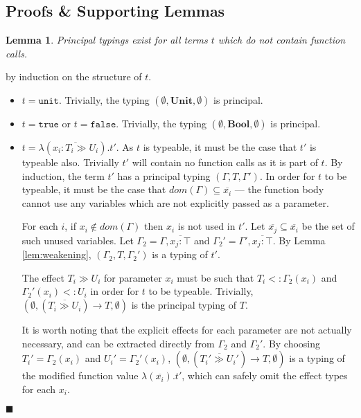 \documentclass[preprint]{sigplanconf}
\newtheorem{lem}{Lemma}
\newcommand{\lemref}[1]{Lemma \ref{#1}}
\newcommand{\unitv}{\mathtt{unit}}
\newcommand{\unitt}{\mathbf{Unit}}
\newcommand{\truev}{\mathtt{true}}
\newcommand{\falsev}{\mathtt{false}}
\newcommand{\boolt}{\mathbf{Bool}}
\newcommand{\funv}[4]{\lambda(\overline{#1 : #2 \gg #3}).#4}
\newcommand{\funt}[3]{(\overline{#1 \gg #2}) \rightarrow #3}
\newcommand{\qed}{$\blacksquare$}
\newenvironment{proof}{\vspace{1ex}\noindent{\bf Proof}\hspace{0.5em}}
  {\hfill\qed\vspace{1ex}}
\begin{document}

\subsection{Proofs \& Supporting Lemmas}

\begin{lem}
\label{lem:principal_nofun}
Principal typings exist for all terms $t$ which do not contain function calls.
\end{lem}

\begin{proof}
by induction on the structure of $t$.

\begin{itemize}
\item $t = \unitv$. 
Trivially, the typing $(\emptyset, \unitt, \emptyset)$ is principal.

\item $t = \truev$ or $t = \falsev$. 
Trivially, the typing $(\emptyset, \boolt, \emptyset)$ is principal.

\item $t = \funv{x_i}{T_i}{U_i}{t'}$. 
As $t$ is typeable, it must be the case that $t'$ is typeable also. Trivially
$t'$ will contain no function calls as it is part of $t$.
By induction, the term $t'$ has a principal typing
$(\Gamma, T, \Gamma')$. In order for $t$ to be typeable, it must be the case
that $dom(\Gamma) \subseteq \overline{x_i}$ --- the function body cannot use
any variables which are not explicitly passed as a parameter. 

For each $i$, if $x_i \notin dom(\Gamma)$
then $x_i$ is not used in $t'$. Let $\overline{x_j} \subseteq \overline{x_i}$
be the set of such unused variables.
Let $\Gamma_2 = \Gamma, \overline{x_j : \top}$ and 
$\Gamma_2' = \Gamma', \overline{x_j : \top}$.
By \lemref{lem:weakening}, $(\Gamma_2, T, \Gamma_2')$ is a typing of $t'$.

The effect $T_i \gg U_i$ for parameter $x_i$ must be such that 
$T_i <: \Gamma_2(x_i)$ and $\Gamma_2'(x_i) <: U_i$ in order for
$t$ to be typeable. 
Trivially, $(\emptyset, \funt{T_i}{U_i}{T}, \emptyset)$ is the principal
typing of $T$.

It is worth noting that the explicit effects for each parameter are not
actually necessary, and can be extracted directly from $\Gamma_2$
and $\Gamma_2'$. By choosing $T_i' = \Gamma_2(x_i)$ and $U_i' = \Gamma_2'(x_i)$,
$(\emptyset, \funt{T_i'}{U_i'}{T}, \emptyset)$ is a typing of the modified
function value $\lambda (\overline{x_i}) . t'$, which can safely omit the
effect types for each $x_i$.


\end{itemize}
\end{proof}
\end{document}
